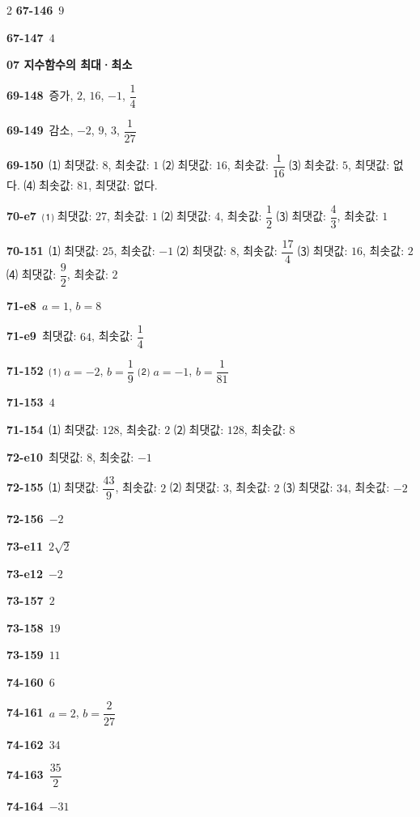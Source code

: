 \documentclass[10pt,a4paper]{article}
\begin{document}
\begin{multicols}{2}
\noindent\textbf{67-146}\ $9$\par
\noindent\textbf{67-147}\ $4$\par
\noindent\textbf{07 지수함수의 최대·최소}\par\smallskip
\noindent\textbf{69-148}\ 증가, $2$, $16$, $-1$, $\dfrac{1}{4}$\par
\noindent\textbf{69-149}\ 감소, $-2$, $9$, $3$, $\dfrac{1}{27}$\par
\noindent\textbf{69-150}\ ⑴ 최댓값: $8$, 최솟값: $1$ ⑵ 최댓값: $16$, 최솟값: $\dfrac{1}{16}$ ⑶ 최솟값: $5$, 최댓값: 없다. ⑷ 최솟값: $81$, 최댓값: 없다.\par
\noindent\textbf{70-e7}\ ⑴ 최댓값: $27$, 최솟값: $1$ ⑵ 최댓값: $4$, 최솟값: $\dfrac{1}{2}$ ⑶ 최댓값: $\dfrac{4}{3}$, 최솟값: $1$\par
\noindent\textbf{70-151}\ ⑴ 최댓값: $25$, 최솟값: $-1$ ⑵ 최댓값: $8$, 최솟값: $\dfrac{17}{4}$ ⑶ 최댓값: $16$, 최솟값: $2$ ⑷ 최댓값: $\dfrac{9}{2}$, 최솟값: $2$\par
\noindent\textbf{71-e8}\ $a=1$, $b=8$\par
\noindent\textbf{71-e9}\ 최댓값: $64$, 최솟값: $\dfrac{1}{4}$\par
\noindent\textbf{71-152}\ ⑴ $a=-2$, $b=\dfrac{1}{9}$ ⑵ $a=-1$, $b=\dfrac{1}{81}$\par
\noindent\textbf{71-153}\ $4$\par
\noindent\textbf{71-154}\ ⑴ 최댓값: $128$, 최솟값: $2$ ⑵ 최댓값: $128$, 최솟값: $8$\par
\noindent\textbf{72-e10}\ 최댓값: $8$, 최솟값: $-1$\par
\noindent\textbf{72-155}\ ⑴ 최댓값: $\dfrac{43}{9}$, 최솟값: $2$ ⑵ 최댓값: $3$, 최솟값: $2$ ⑶ 최댓값: $34$, 최솟값: $-2$\par
\noindent\textbf{72-156}\ $-2$\par
\noindent\textbf{73-e11}\ $2\sqrt{2}$\par
\noindent\textbf{73-e12}\ $-2$\par
\noindent\textbf{73-157}\ $2$\par
\noindent\textbf{73-158}\ $19$\par
\noindent\textbf{73-159}\ $11$\par
\noindent\textbf{74-160}\ $6$\par
\noindent\textbf{74-161}\ $a=2$, $b=\dfrac{2}{27}$\par
\noindent\textbf{74-162}\ $34$\par
\noindent\textbf{74-163}\ $\dfrac{35}{2}$\par
\noindent\textbf{74-164}\ $-31$\par

\end{multicols}
\end{document}
